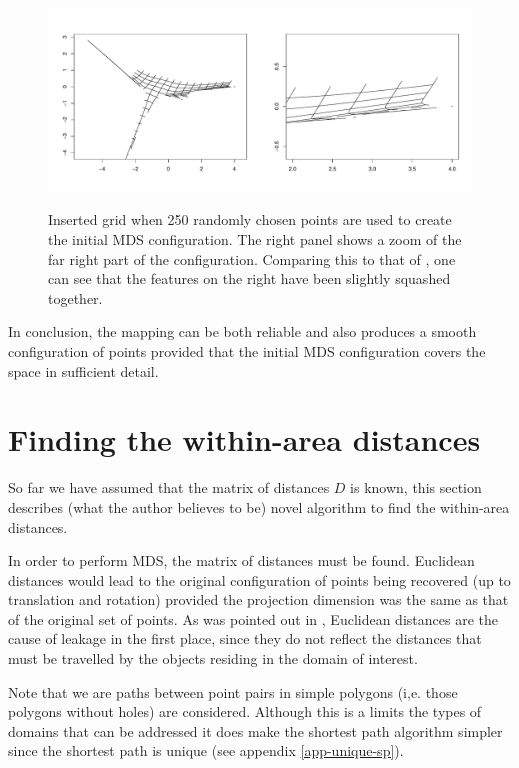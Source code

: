 \begin{figure}
\centering
\includegraphics[width=5in]{mds/figs/wt2-grid-samp.pdf} \\
\caption{Inserted grid when 250 randomly chosen points are used to create the initial MDS configuration. The right panel shows a zoom of the far right part of the configuration. Comparing this to that of , one can see that the features on the right have been slightly squashed together.}
\label{wt2-grid-samp}
\end{figure}

In conclusion, the mapping can be both reliable and also produces a smooth configuration of points provided that the initial MDS configuration covers the space in sufficient detail.


\section{Finding the within-area distances}
\label{mdsdist}

So far we have assumed that the matrix of distances $D$ is known, this section describes (what the author believes to be) novel algorithm to find the within-area distances.

In order to perform MDS, the matrix of distances must be found. Euclidean distances would lead to the original configuration of points being recovered (up to translation and rotation) provided the projection dimension was the same as that of the original set of points. As was pointed out in , Euclidean distances are the cause of leakage in the first place, since they do not reflect the distances that must be travelled by the objects residing in the domain of interest.

Note that we are paths between point pairs in simple polygons (i,e. those polygons without holes) are considered. Although this is a limits the types of domains that can be addressed it does make the shortest path algorithm simpler since the shortest path is unique (see appendix \ref{app-unique-sp}).

